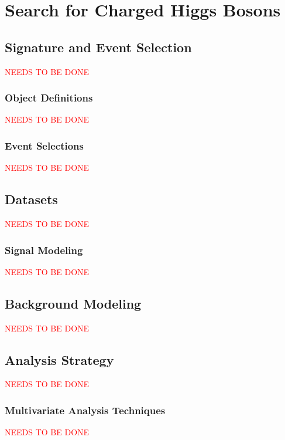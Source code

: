 \chapter{Search for Charged Higgs Bosons}

\section{Signature and Event Selection}{
	\textcolor{red}{NEEDS TO BE DONE}
	
}

	\subsection{Object Definitions}{
	\textcolor{red}{NEEDS TO BE DONE}

	}

	\subsection{Event Selections}{
	\textcolor{red}{NEEDS TO BE DONE}

	}

\section{Datasets}{
	\textcolor{red}{NEEDS TO BE DONE}
	
}
	
	\subsection{Signal Modeling}{
	\textcolor{red}{NEEDS TO BE DONE}

	}

\section{Background Modeling}{
	\textcolor{red}{NEEDS TO BE DONE}
	
}

\section{Analysis Strategy}{
	\textcolor{red}{NEEDS TO BE DONE}
	
}

	\subsection{Multivariate Analysis Techniques}{
	\textcolor{red}{NEEDS TO BE DONE}

	}

